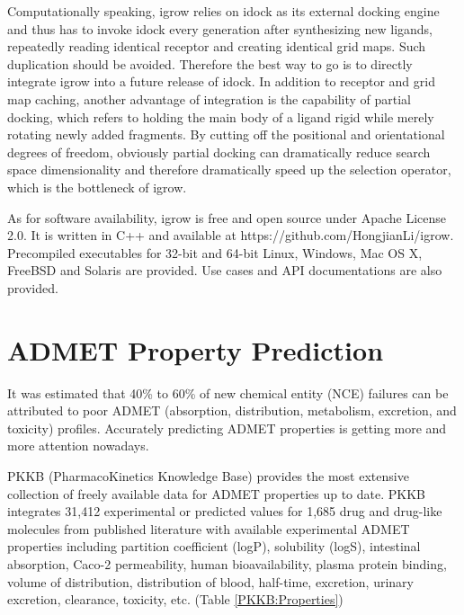 Computationally speaking, igrow relies on idock as its external docking engine and thus has to invoke idock every generation after synthesizing new ligands, repeatedly reading identical receptor and creating identical grid maps. Such duplication should be avoided. Therefore the best way to go is to directly integrate igrow into a future release of idock. In addition to receptor and grid map caching, another advantage of integration is the capability of partial docking, which refers to holding the main body of a ligand rigid while merely rotating newly added fragments. By cutting off the positional and orientational degrees of freedom, obviously partial docking can dramatically reduce search space dimensionality and therefore dramatically speed up the selection operator, which is the bottleneck of igrow.
 
As for software availability, igrow is free and open source under Apache License 2.0. It is written in C++ and available at https://github.com/HongjianLi/igrow. Precompiled executables for 32-bit and 64-bit Linux, Windows, Mac OS X, FreeBSD and Solaris are provided. Use cases and API documentations are also provided.

\iffalse

\section{ADMET Property Prediction}

It was estimated that 40\% to 60\% of new chemical entity (NCE) failures can be attributed to poor ADMET (absorption, distribution, metabolism, excretion, and toxicity) profiles. Accurately predicting ADMET properties is getting more and more attention nowadays.

PKKB (PharmacoKinetics Knowledge Base) \citep{1133} provides the most extensive collection of freely available data for ADMET properties up to date. PKKB integrates 31,412 experimental or predicted values for 1,685 drug and drug-like molecules from published literature with available experimental ADMET properties including partition coefficient (logP), solubility (logS), intestinal absorption, Caco-2 permeability, human bioavailability, plasma protein binding, volume of distribution, distribution of blood, half-time, excretion, urinary excretion, clearance, toxicity, etc. (Table \ref{PKKB:Properties})

